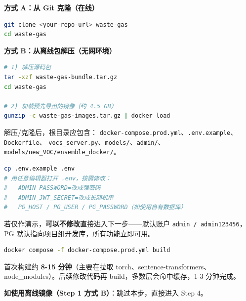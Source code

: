 \documentclass[UTF8,a4paper,11pt]{ctexart}
\begin{document}
\begin{stepbox}
\textbf{方式 A：从 Git 克隆（在线）}

\begin{lstlisting}[language=bash]
git clone <your-repo-url> waste-gas
cd waste-gas
\end{lstlisting}

\textbf{方式 B：从离线包解压（无网环境）}

\begin{lstlisting}[language=bash]
# 1) 解压源码包
tar -xzf waste-gas-bundle.tar.gz
cd waste-gas

# 2) 加载预先导出的镜像（约 4.5 GB）
gunzip -c waste-gas-images.tar.gz | docker load
\end{lstlisting}

解压/克隆后，根目录应包含：
\texttt{docker-compose.prod.yml}、\texttt{.env.example}、\texttt{Dockerfile}、
\texttt{vocs\_server.py}、\texttt{models/}、\texttt{admin/}、
\texttt{models/new\_VOC/ensemble\_docker/}。
\end{stepbox}

\begin{stepbox}
\begin{lstlisting}[language=bash]
cp .env.example .env
# 用任意编辑器打开 .env，按需修改：
#   ADMIN_PASSWORD=改成强密码
#   ADMIN_JWT_SECRET=改成长随机串
#   PG_HOST / PG_USER / PG_PASSWORD（如使用自有数据库）
\end{lstlisting}

\begin{infobox}[最小可用]
若仅作演示，\textbf{可以不修改}直接进入下一步——默认账户 \texttt{admin / admin123456}，
PG 默认指向项目组开发库，所有功能立即可用。
\end{infobox}
\end{stepbox}

\begin{stepbox}
\begin{lstlisting}[language=bash]
docker compose -f docker-compose.prod.yml build
\end{lstlisting}

首次构建约 \textbf{8-15 分钟}（主要在拉取 torch、sentence-transformers、
node\_modules）。后续修改代码再 build，多数层会命中缓存，1-3 分钟完成。

\textbf{如使用离线镜像（Step 1 方式 B）}：跳过本步，直接进入 Step 4。
\end{stepbox}
\end{document}
